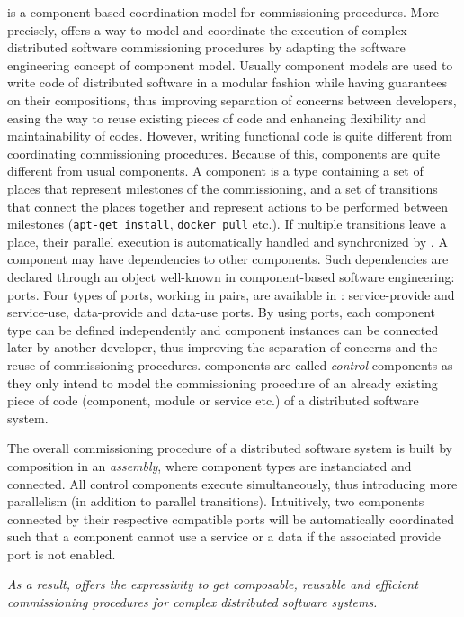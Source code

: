 \mad is a component-based coordination model for commissioning
procedures. More precisely, \mad offers a way to model and
coordinate the execution of complex distributed software commissioning
procedures by adapting the software engineering concept of component
model. Usually component models are used to write code of distributed
software in a modular fashion while having guarantees on their
compositions, thus improving separation of concerns between
developers, easing the way to reuse existing pieces of code and
enhancing flexibility and maintainability of codes. However, writing
functional code is quite different from coordinating commissioning
procedures. Because of this, \mad components are quite different from
usual components.
A \mad component is a type containing a set of places that represent
milestones of the commissioning, and a set of transitions that connect
the places together and represent actions to be performed between
milestones (\eg \texttt{apt-get install}, \texttt{docker pull}
etc.). If multiple transitions leave a place, their parallel execution
is automatically handled and synchronized by \mad. A component may
have dependencies to other components. Such dependencies are
declared through an object well-known in component-based software
engineering: ports. Four types of ports, working in pairs, are
available in \mad: service-provide and service-use, data-provide and
data-use ports. By using ports, each component type can be defined
independently and component instances can be connected later by
another developer, thus improving the separation of concerns and the
reuse of commissioning procedures. \mad components are called \emph{control}
components as they only intend to model the commissioning procedure of
an already existing piece of code (component, module or service etc.)
of a distributed software system.


The overall commissioning procedure of a distributed software system
is built by composition in an \emph{assembly}, where component
types are instanciated and connected. All control components execute
simultaneously, thus introducing more parallelism (in addition to
parallel transitions). Intuitively, two components connected by their
respective compatible ports will be automatically coordinated such
that a component cannot use a service or a data if the associated
provide port is not enabled.

\emph{As a result, \mad offers the expressivity to get composable,
reusable and efficient commissioning procedures for complex
distributed software systems.}

